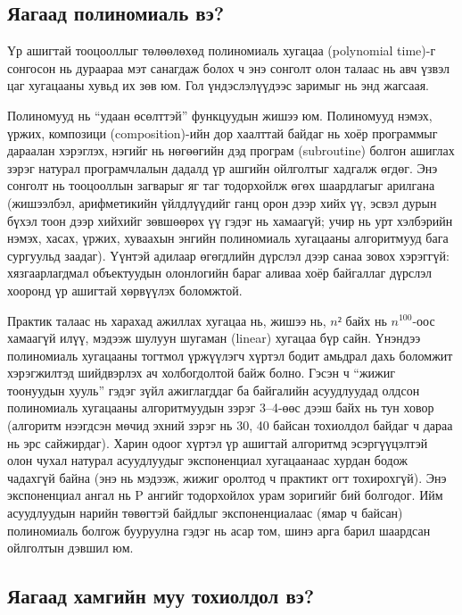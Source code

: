 \subsection{Яагаад полиномиаль вэ?}


Үр ашигтай тооцооллыг төлөөлөхөд полиномиаль хугацаа (polynomial time)-г сонгосон нь дураараа мэт санагдаж болох ч энэ сонголт олон талаас нь авч үзвэл цаг хугацааны хувьд их зөв юм. Гол үндэслэлүүдээс заримыг нь энд жагсаая.


Полиномууд нь “удаан өсөлттэй” функцуудын жишээ юм. Полиномууд нэмэх, үржих, композици (composition)-ийн дор хаалттай байдаг нь хоёр программыг дараалан хэрэглэх, нэгийг нь нөгөөгийн дэд програм (subroutine) болгон ашиглах зэрэг натурал програмчлалын дадалд үр ашгийн ойлголтыг хадгалж өгдөг. Энэ сонголт нь тооцооллын загварыг яг таг тодорхойлж өгөх шаардлагыг арилгана (жишээлбэл, арифметикийн үйлдлүүдийг ганц орон дээр хийх үү, эсвэл дурын бүхэл тоон дээр хийхийг зөвшөөрөх үү гэдэг нь хамаагүй; учир нь урт хэлбэрийн нэмэх, хасах, үржих, хуваахын энгийн полиномиаль хугацааны алгоритмууд бага сургуульд заадаг). Үүнтэй адилаар өгөгдлийн дүрслэл дээр санаа зовох хэрэггүй: хязгаарлагдмал объектуудын олонлогийн бараг аливаа хоёр байгаллаг дүрслэл хооронд үр ашигтай хөрвүүлэх боломжтой.


Практик талаас нь харахад ажиллах хугацаа нь, жишээ нь, $n²$ байх нь $n^100$-оос хамаагүй илүү, мэдээж шулуун шугаман (linear) хугацаа бүр сайн. Үнэндээ полиномиаль хугацааны тогтмол үржүүлэгч хүртэл бодит амьдрал дахь боломжит хэрэгжилтэд шийдвэрлэх ач холбогдолтой байж болно. Гэсэн ч “жижиг тоонуудын хууль” гэдэг зүйл ажиглагддаг ба байгалийн асуудлуудад олдсон полиномиаль хугацааны алгоритмуудын зэрэг 3–4-өөс дээш байх нь тун ховор (алгоритм нээгдсэн мөчид эхний зэрэг нь 30, 40 байсан тохиолдол байдаг ч дараа нь эрс сайжирдаг). Харин одоог хүртэл үр ашигтай алгоритмд эсэргүүцэлтэй олон чухал натурал асуудлуудыг экспоненциал хугацаанаас хурдан бодож чадахгүй байна (энэ нь мэдээж, жижиг оролтод ч практикт огт тохирохгүй). Энэ экспоненциал ангал нь P ангийг тодорхойлох урам зоригийг бий болгодог. Ийм асуудлуудын нарийн төвөгтэй байдлыг экспоненциалаас (ямар ч байсан) полиномиаль болгож бууруулна гэдэг нь асар том, шинэ арга барил шаардсан ойлголтын дэвшил юм.


\subsection{Яагаад хамгийн муу тохиолдол вэ?}


